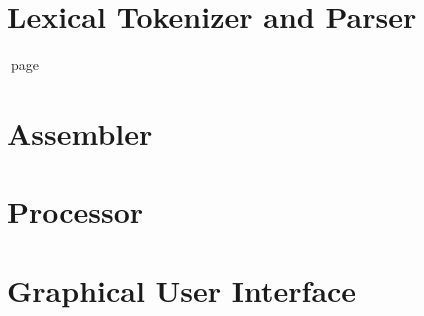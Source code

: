 

\section{Lexical Tokenizer and Parser}


\n page
\section{Assembler}


\newpage
\section{Processor}


\newpage
\section{Graphical User Interface}

